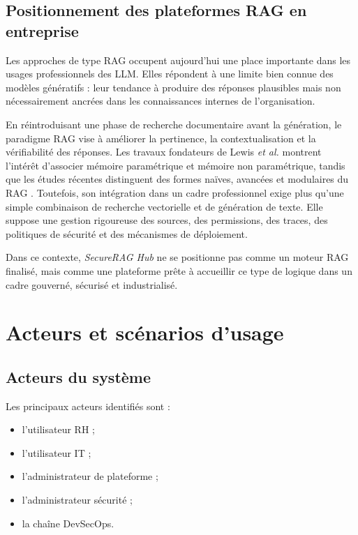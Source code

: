 \subsection{Positionnement des plateformes RAG en entreprise}

Les approches de type RAG occupent aujourd’hui une place importante dans les usages professionnels des LLM. Elles répondent à une limite bien connue des modèles génératifs : leur tendance à produire des réponses plausibles mais non nécessairement ancrées dans les connaissances internes de l’organisation.

En réintroduisant une phase de recherche documentaire avant la génération, le paradigme RAG vise à améliorer la pertinence, la contextualisation et la vérifiabilité des réponses. Les travaux fondateurs de Lewis \textit{et al.} montrent l’intérêt d’associer mémoire paramétrique et mémoire non paramétrique, tandis que les études récentes distinguent des formes naïves, avancées et modulaires du RAG \cite{lewis_rag_2020,karpukhin_dpr_2020,gao_rag_survey_2024}. Toutefois, son intégration dans un cadre professionnel exige plus qu’une simple combinaison de recherche vectorielle et de génération de texte. Elle suppose une gestion rigoureuse des sources, des permissions, des traces, des politiques de sécurité et des mécanismes de déploiement.

Dans ce contexte, \textit{SecureRAG Hub} ne se positionne pas comme un moteur RAG finalisé, mais comme une plateforme prête à accueillir ce type de logique dans un cadre gouverné, sécurisé et industrialisé.

\section{Acteurs et scénarios d’usage}

\subsection{Acteurs du système}

Les principaux acteurs identifiés sont :

\begin{itemize}
    \item l’utilisateur RH ;
    \item l’utilisateur IT ;
    \item l’administrateur de plateforme ;
    \item l’administrateur sécurité ;
    \item la chaîne DevSecOps.
\end{itemize}

